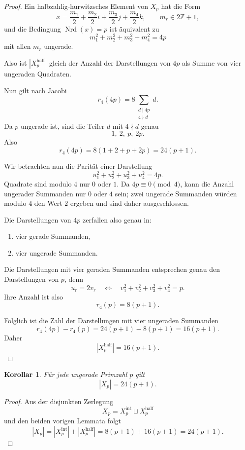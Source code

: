 \documentclass[12pt,a4paper]{article}
\theoremstyle{plain}
\newtheorem{korollar}[satz]{Korollar}
\theoremstyle{definition}
\theoremstyle{remark}
\newcommand{\Z}{\mathbb Z}
\newcommand{\nrd}{\operatorname{Nrd}}
\begin{document}
	\begin{proof}
		Ein halbzahlig-hurwitzsches Element von \(X_p\) hat die Form
		\[
		x=\frac{m_1}{2}+\frac{m_2}{2}i+\frac{m_3}{2}j+\frac{m_4}{2}k,
		\qquad m_r\in 2\Z+1,
		\]
		und die Bedingung \(\nrd(x)=p\) ist äquivalent zu
		\[
		m_1^2+m_2^2+m_3^2+m_4^2=4p
		\]
		mit allen \(m_r\) ungerade.
		
		Also ist \(|X_p^{\mathrm{half}}|\) gleich der Anzahl der Darstellungen von \(4p\) als Summe von vier ungeraden Quadraten.
		
		Nun gilt nach Jacobi
		\[
		r_4(4p)=8\sum_{\substack{d\mid 4p\\4\nmid d}} d.
		\]
		Da \(p\) ungerade ist, sind die Teiler \(d\) mit \(4\nmid d\) genau
		\[
		1,\ 2,\ p,\ 2p.
		\]
		Also
		\[
		r_4(4p)=8(1+2+p+2p)=24(p+1).
		\]
		
		Wir betrachten nun die Parität einer Darstellung
		\[
		u_1^2+u_2^2+u_3^2+u_4^2=4p.
		\]
		Quadrate sind modulo \(4\) nur \(0\) oder \(1\). Da \(4p\equiv 0\pmod4\), kann die Anzahl ungerader Summanden nur \(0\) oder \(4\) sein; zwei ungerade Summanden würden modulo \(4\) den Wert \(2\) ergeben und sind daher ausgeschlossen.
		
		Die Darstellungen von \(4p\) zerfallen also genau in:
		\begin{enumerate}
			\item vier gerade Summanden,
			\item vier ungerade Summanden.
		\end{enumerate}
		
		Die Darstellungen mit vier geraden Summanden entsprechen genau den Darstellungen von \(p\), denn
		\[
		u_r=2v_r
		\quad\Longleftrightarrow\quad
		v_1^2+v_2^2+v_3^2+v_4^2=p.
		\]
		Ihre Anzahl ist also
		\[
		r_4(p)=8(p+1).
		\]
		
		Folglich ist die Zahl der Darstellungen mit vier ungeraden Summanden
		\[
		r_4(4p)-r_4(p)=24(p+1)-8(p+1)=16(p+1).
		\]
		Daher
		\[
		|X_p^{\mathrm{half}}|=16(p+1).
		\]
	\end{proof}
	
	\begin{korollar}
		Für jede ungerade Primzahl \(p\) gilt
		\[
		|X_p|=24(p+1).
		\]
	\end{korollar}
	
	\begin{proof}
		Aus der disjunkten Zerlegung
		\[
		X_p=X_p^{\mathrm{int}}\sqcup X_p^{\mathrm{half}}
		\]
		und den beiden vorigen Lemmata folgt
		\[
		|X_p|
		=
		|X_p^{\mathrm{int}}|+|X_p^{\mathrm{half}}|
		=
		8(p+1)+16(p+1)
		=
		24(p+1).
		\]
	\end{proof}
	
\end{document}
